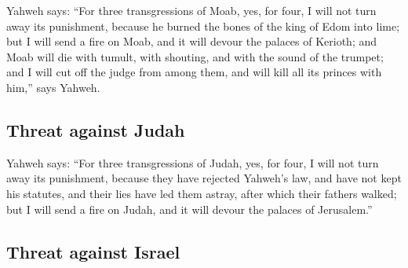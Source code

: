  Yahweh says: ``For three transgressions of Moab, yes, for
four, I will not turn away its punishment, because he burned the bones
of the king of Edom into lime;  but I will send a fire on
Moab, and it will devour the palaces of Kerioth; and Moab will die with
tumult, with shouting, and with the sound of the trumpet; 
and I will cut off the judge from among them, and will kill all its
princes with him,'' says Yahweh.

\hypertarget{threat-against-judah}{%
\subsection{Threat against Judah}\label{threat-against-judah}}

 Yahweh says: ``For three transgressions of Judah, yes,
for four, I will not turn away its punishment, because they have
rejected Yahweh's law, and have not kept his statutes, and their lies
have led them astray, after which their fathers walked; 
but I will send a fire on Judah, and it will devour the palaces of
Jerusalem.''

\hypertarget{threat-against-israel}{%
\subsection{Threat against Israel}\label{threat-against-israel}}

